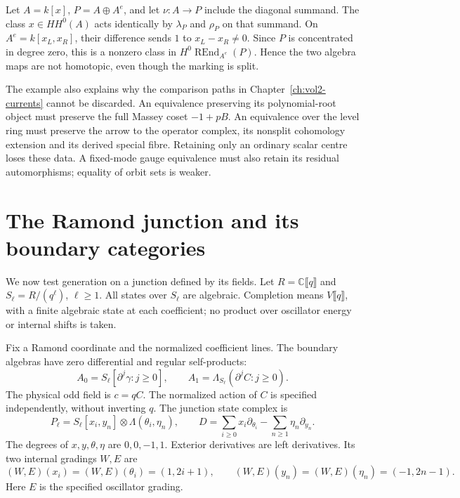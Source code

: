\begin{example}\label{ex:vol2-split-mark-two-actions}
Let \(A=k[x]\), \(P=A\oplus A^e\), and let \(\nu:A\to P\)
include the diagonal summand. The class \(x\in HH^0(A)\)
acts identically by \(\lambda_P\) and \(\rho_P\) on that
summand. On \(A^e=k[x_L,x_R]\), their difference sends \(1\)
to \(x_L-x_R\ne0\). Since \(P\) is concentrated in degree
zero, this is a nonzero class in
\(H^0\operatorname{REnd}_{A^e}(P)\). Hence the two algebra
maps are not homotopic, even though the marking is split.
\end{example}

The example also explains why the comparison paths in
Chapter~\ref{ch:vol2-currents} cannot be discarded.
An equivalence preserving its polynomial-root object must
preserve the full Massey coset \(-1+pB\). An equivalence over
the level ring must preserve the arrow to the operator complex,
its nonsplit cohomology extension and its derived special
fibre. Retaining only an ordinary scalar centre loses these
data. A fixed-mode gauge equivalence must also retain its
residual automorphisms; equality of orbit sets is weaker.

\section{The Ramond junction and its boundary categories}
\label{sec:vol2-ramond-reconstruction}

We now test generation on a junction defined by its fields.
Let \(R=\mathbb C\llbracket q\rrbracket\) and
\(S_\ell=R/(q^\ell)\), \(\ell\ge1\).
All states over \(S_\ell\) are algebraic.
Completion means \(V\llbracket q\rrbracket\), with a finite
algebraic state at each coefficient; no product over oscillator
energy or internal shifts is taken.

Fix a Ramond coordinate and the normalized coefficient lines.
The boundary algebras have zero differential and regular
self-products:
\[
 A_0=S_\ell[\partial^j\gamma:j\ge0],\qquad
 A_1=\Lambda_{S_\ell}(\partial^j C:j\ge0).
\]
The physical odd field is \(c=qC\). The normalized action
of \(C\) is specified independently, without inverting \(q\).
The junction state complex is
\begin{equation}\label{eq:vol2-ramond-junction}
 P_\ell=S_\ell[x_i,y_n]\otimes\Lambda(\theta_i,\eta_n),
 \qquad
 D=\sum_{i\ge0}x_i\partial_{\theta_i}
             -\sum_{n\ge1}\eta_n\partial_{y_n}.
\end{equation}
The degrees of \(x,y,\theta,\eta\) are \(0,0,-1,1\).
Exterior derivatives are left derivatives. Its two internal
gradings \(W,E\) are
\[
 (W,E)(x_i)=(W,E)(\theta_i)=(1,2i+1),\qquad
 (W,E)(y_n)=(W,E)(\eta_n)=(-1,2n-1).
\]
Here \(E\) is the specified oscillator grading.

